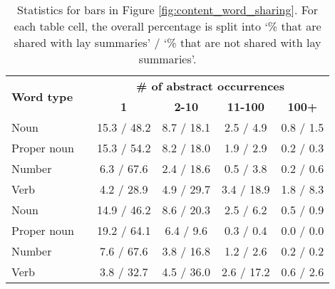 \documentclass[11pt]{article}
\begin{document}
\begin{table*}[t]
    \centering
    \begin{tabular}{llcccc} \hline
        \multirow{2}{*}{\textbf{Word type}} && \multicolumn{4}{c}{\textbf{\# of abstract occurrences}}  \\ 
        \cline{3-6} && \textbf{1} & \textbf{2-10} & \textbf{11-100} & \textbf{100+} \\ 
        \hline
        \parbox[t]{1mm}{\footnotesize {}}
        \hspace{3pt} Noun        && 15.3 / 48.2 & 8.7 / 18.1 & 2.5 / 4.9  & 0.8 / 1.5 \\
        \hspace{8pt} Proper noun && 15.3 / 54.2 & 8.2 / 18.0 & 1.9 / 2.9  & 0.2 / 0.3 \\   
        \hspace{8pt} Number      && 6.3  / 67.6 & 2.4 / 18.6 & 0.5 / 3.8  & 0.2 / 0.6 \\ 
        \hspace{8pt} Verb        && 4.2 / 28.9  & 4.9 / 29.7 & 3.4 / 18.9 & 1.8 / 8.3 \\
        \hline
        \parbox[t]{1mm}{\footnotesize {}}
        \hspace{3pt} Noun        && 14.9 / 46.2 & 8.6 / 20.3 & 2.5 / 6.2 & 0.5 / 0.9 \\
        \hspace{8pt} Proper noun && 19.2 / 64.1 & 6.4 / 9.6  & 0.3 / 0.4 & 0.0 / 0.0 \\
        \hspace{8pt} Number      && 7.6  / 67.6 & 3.8 / 16.8 & 1.2 / 2.6 & 0.2 / 0.2 \\ 
        \hspace{8pt} Verb        && 3.8  / 32.7 & 4.5 / 36.0 & 2.6 / 17.2 & 0.6 / 2.6  \\
        \hline
\end{tabular}
    \caption{Statistics for bars in Figure \ref{fig:content_word_sharing}. For each table cell, the overall percentage is split into `\% that are shared with lay summaries' / `\% that are not shared with lay summaries'.}
    \label{tab:rare_words_type}
\end{table*}
\end{document}
